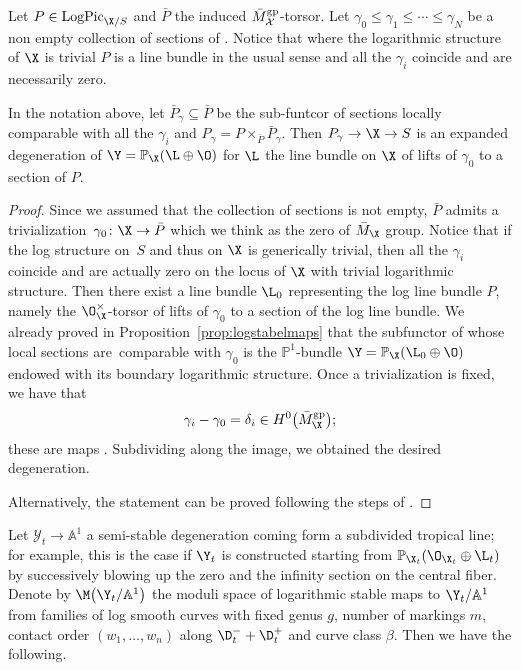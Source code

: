 Let $P\in\operatorname{LogPic}_{\X\slash S}$ and
$\bar{P}$ the induced $\bar{M}^{\rm gp}_{\mathcal{X}}$-torsor. Let $\gamma_0\leq\gamma_1\leq\cdots\leq\gamma_N$ be a non empty collection of sections of . Notice that where the logarithmic structure of $\X$ is trivial $P$ is a line bundle in the usual sense and all the $\gamma_i$ coincide and are necessarily zero.
\begin{lem}\label{lem:tropicaline}
In the notation above, let $\bar{P}_{\gamma}\subseteq \bar{P}$ be the sub-funtcor of sections locally comparable with all the $\gamma_i$ and $P_{\gamma}=P\times_{\bar{P}}\bar{P}_{\gamma}$. Then $P_{\gamma}\to\X\to S$ is an expanded degeneration of $\Y=\mathbb P_{\X}(\L\oplus\O)$ for $\L$ the line bundle on $\X$ of lifts of $\gamma_0$ to a section of $P$.
\end{lem}
\begin{proof}
Since we assumed that the collection of sections is not empty, $\bar{P}$ admits a trivialization~${\gamma_0\colon\X\to\bar{P}}$ which we think as the zero of $\bar{M}_{\X}$ group. Notice that if the log structure on~$S$ and thus on $\X$ is generically trivial, then all the $\gamma_i$ coincide and are actually zero on the locus of $\X$ with trivial logarithmic structure. Then there exist a line bundle $\L_0$ representing the log line bundle $P$, namely the $\O_{\X}^\times$-torsor of lifts of $\gamma_0$ to a section of the log line bundle. We already proved in Proposition~\ref{prop:logstabelmaps} that the subfunctor of  whose local sections are~comparable with $\gamma_0$ is the $\mathbb{P}^1$-bundle $\Y=\mathbb P_{\X}(\L_0\oplus\O)$ endowed with its boundary logarithmic structure.
Once a trivialization is fixed, we have that
\[
\gamma_i-\gamma_0=\delta_i\in H^0\bigl(\bar{M}_{\X}^{\rm gp}\bigr);
\] these are maps . Subdividing along the image, we obtained the desired degeneration.

 Alternatively, the statement can be proved following the steps of \cite[Proposition~5.2.4]{marcuswiselog}.
\end{proof}

Let $\mathcal Y_t\to\mathbb A^1$ a semi-stable degeneration coming form a subdivided tropical line; for example, this is the case if $\Y_t$ is constructed starting from $\mathbb P_{\X_t}(\O_{\X_t}\oplus\L_t)$ by successively blowing up the zero and the infinity section on the central fiber.
Denote by $\M\bigl(\Y_t\slash\mathbb A^1\bigr)$ the moduli space of logarithmic stable maps to $\Y_t\slash\mathbb A^1$ from families of log smooth curves with fixed genus $g$, number of markings $m$, contact order $(w_1,\dots, w_n)$ along $\D_t^-+\D_t^+$ and curve class $\beta$. Then we have the following.

